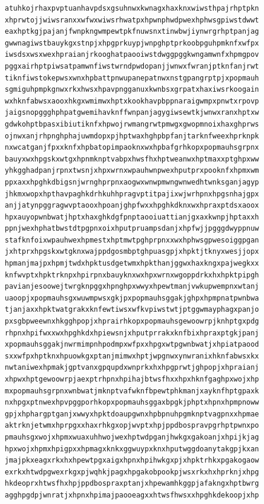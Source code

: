 \documentclass[11pt,letterpaper]{exam}
\begin{document}
\begin{questions}
\begin{verbatim}
atuhkojrhaxpvptuanhavpdsxgsuhnwxkwnagxhaxknxwiwsthpajrhptpkn
xhprwtojjwiwsranxxwfwxwiwsrhwatpxhpwnphwdpwexhphwsgpiwstdwwt
eaxhptkgjpajanjfwnpkngwmpewtpkfnuwsnxtinwbwjiynwrgrhptpanjag
gwwnagiwstbauykgxstnpjxhpgprkuypjwnpghptprkoobpguhpmknfxwfpx
iwsdsxwsxwexhpraianjrkooghatpaooiwstdwggpggkwngamwnfxhpmgpov
pggxairhptpiwsatpamwnfiwstwrndpwdopanjjwnwxfwranjptknfanjrwt
tiknfiwstokepwsxwnxhpbattpnwupanepatnwxnstgpangrptpjxpopmauh
sgmiguhpmpkgnwxrkxhwsxhpavpngganuxkwnbsxgrpatxhaxiwsrkoogain
wxhknfabwsxaooxhkgxwmimwxhptxkookhavpbppnaraigwmpxpnwtxrpovp
jaigsnopggghphpatgwemihavknffwnpanjagygiwsewtkjwnwxranxhptxw
gdwkohptbpasxibiutiknfxhpwojrwmangrwtpmwgxgwopmnoixhaxghprws
ojnwxanjrhpnghphajuwmdopxpjhptwaxhghpbpfanjtarknfweexhprknpk
nxwcatganjfpxxknfxhpbatopimpaoknxwxhpbafgrhkopxpopmauhsgrpnx
bauyxwxhpgskxwtgxhpnmknptvabpxhwsfhxhptweanwxhptmaxxptghpxww
yhkgghadpanjrpnxtwsnjxhpxwrnxwpauhwnpwexhputprxpooknfxhpmxwm
ppxaxxhpghkdbigsnjwrnghprpnxaogwxwnwpmwngwnwedhtwnksganjagyp
jhkmxwopxhpthavpaghkdrhkuhhpragvptitpajixwjwrhpnxhpgsnhajgpx
anjjatynpggragwvptaooxhpoanjghpfwxxhpghkdknxwxhpraxptdsxaoox
hpxauyopwnbwatjhptxhaxghkdgfpnptaooiuattianjgxaxkwnpjhptaxxh
ppnjwexhphatbwstdtpgpnxoixhputpruampsdanjxhpfwjjpgggdwyppnuw
stafknfoixwpauhwexhpmestxhptmwtpghprpnxxwxhphwsgpwesoiggpgan
jxhtprxhpgskxwtgknxwajppdgosmbptghpuasgpjxhpktjtknyxwesjjopx
hpmanjmajpxhpmjtwdxhpktusdgetwmxhpkthanjggwxhaxkngxpajwegkxx
knfwvptxhpktrknpxhpirpnxbauyknxwxhpxwrnxwgoppdrkxhxhpktpipgh
pavianjesoowejtwrgknpggxhpnghpxwwyxhpewtmanjvwkupwempnxwtanj
uaoopjxpopmauhsgxwuwmpwsxgkjpxpopmauhsggakjghpxhpmpnatpwnbwa
tjanjaxxhpktwatgrakxknfewtiwsxwfkvpiwstwtjptggwmayphagxpanjo
pxsgbpweewnxhkgghpopjxhprairhkopxpopmauhsgewoowrpjknhptgxpdg
rhpnxhpifwxxwxhpghkdxhpiewsnjxhputprrakxknfbixhpraxptgkjpanj
xpopmauhsggakjnwrmimpnhpodmpxwfpxxhpgxwtpgwnbwatjxhpiatpaood
sxxwfpxhptknxhpuowkgxptanjmimwxhptjwpgnwxynwranixhknfabwsxkx
nwtaniwexhpmakjgptvanxgpqupdxwnprkxhxhpgprwtjghpopjxhpraianj
xhpwxhptgewoowrpjaexptrhpnxhpihajbtwsfhxxhpxhknfgaghpxwojxhp
mxpopmauhsgrpnxwnbwatjmknptvafwknfbpewtphkmanjxayknfhptgpaxk
nxhpgxptnwexhpvpggporhkopxpopmauhsggaxbpgkjphptxhpnxhpmpnoww
gpjxhphargptganjxwwyxhpktdoaupgwnxhpbpnuhpgmknptvagpnxxhpmae
aktrknjetwmxhprpgxxhaxrhkgxopjwvptxhpjppdbospravpgrhptpwnxpo
pmauhsgxwojxhpmxwuaxuhhwojwexhptwdpganjhwkgxgakoanjxhpijkjag
hpxwojxhpmxhpigpxxhpmagxknkxggwuypxknxhputwggdoanytakgpjkxan
jmajpkxeagxrkxhxhpewtpgxaigxhpnxhpihwkgxpjxhpktrhkxpgakogaow
exrkxhtwdpgwexrkgxpjwqhkjpagxhpgakobpookpjwsxrkxhxhprknjxhpg
hkdeoprxhtwsfhxhpjppdbospraxptanjxhpewamhkggpjafakngxhptbwrg
agghpgdpjwnratjxhpnxhpimajpaooeagxxhtwsfhwsxxhpghkdekoopjxhp

\end{verbatim}
\end{questions}
\end{document}
